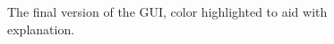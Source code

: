 \documentclass[a4paper]{article}
\begin{document}
\begin{figure}[!h]
  \centering
  \hfill
  \caption{The final version of the GUI, color highlighted to aid with explanation.}
  \label{fig:results}
\end{figure}
\end{document}
